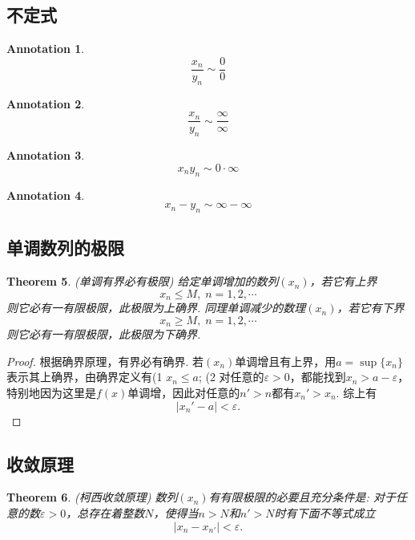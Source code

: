 \documentclass{article}
\newtheorem{theorem}{Theorem}[section]
\newtheorem{annotation}[theorem]{Annotation}
\begin{document}
\subsection{不定式}

\begin{annotation}
$$
\frac{x_n}{y_n} \sim \frac{0}{0}
$$
\end{annotation}

\begin{annotation}
$$
\frac{x_n}{y_n} \sim \frac{\infty}{\infty}
$$
\end{annotation}

\begin{annotation}
$$
x_n y_n \sim  0 \cdot \infty
$$
\end{annotation}

\begin{annotation}
$$
x_n - y_n \sim \infty - \infty
$$
\end{annotation}

\subsection{单调数列的极限}

\begin{theorem}
\rm {\color{red}(单调有界必有极限)} 给定单调增加的数列$(x_n)$，若它有上界
$$
x_n \leq M,\; n = 1,2,\cdots
$$
则它必有一有限极限，此极限为上确界. 同理单调减少的数理$(x_n)$，若它有下界
$$
x_n \geq M, \; n = 1,2,\cdots
$$
则它必有一有限极限，此极限为下确界.
\end{theorem}

\begin{proof}
根据{\color{red}确界原理}，有界必有确界. 若$(x_n)$单调增且有上界，用$a =\sup\{x_n\}$表示其上确界，由确界定义有{\color{blue}(1} $x_n \leq a$; {\color{blue}(2} 对任意的$\varepsilon > 0$，都能找到$x_n > a-\varepsilon$，特别地因为这里是$f(x)$单调增，因此对任意的$n'> n$都有$x_n' > x_n$. 综上有
$$
|x_n' -a| < \varepsilon.
$$
\end{proof}

\subsection{收敛原理}

\begin{theorem}
\rm {\color{red} (柯西收敛原理)} 数列$(x_n)$有有限极限的必要且充分条件是: 对于任意的数$\varepsilon > 0$，总存在着整数$N$，使得当$n > N$和$n' > N$时有下面不等式成立
$$
|x_n - x_{n'}| < \varepsilon.
$$
\end{theorem}
\end{document}
